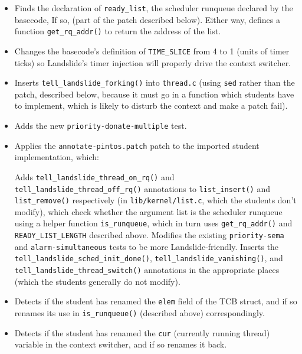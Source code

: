 \begin{itemize}
	\item Finds the declaration of {\tt ready\_list}, the scheduler runqueue declared by the basecode,
		If so,
		(part of the patch described below).
		Either way,
		defines a function {\tt get\_rq\_addr()} to return the address of the %
		list.
	\item Changes the basecode's definition of {\tt TIME\_SLICE} from 4 to 1 (units of timer ticks)
		so Landslide's timer injection will properly drive the context switcher.
	\item Inserts {\tt tell\_landslide\_forking()} into {\tt thread.c}
		(using {\tt sed} rather than the patch, described below,
		because it must go in a function which students have to implement,
		which is likely to disturb the context and make a patch fail).
	\item Adds the new {\tt priority-donate-multiple} test.
	\item Applies the {\tt annotate-pintos.patch} patch to the imported student implementation, which:
	\begin{itemize}
		\llitem Adds {\tt tell\_landslide\_thread\_on\_rq()}
			and {\tt tell\_landslide\_thread\_off\_rq()}
			annotations
			to {\tt list\_insert()} and {\tt list\_remove()} respectively
			(in {\tt lib/kernel/\allowbreak{}list.c}, which the students don't modify),
			which
			check whether the argument list
			is the scheduler runqueue
			using a helper function {\tt is\_runqueue},
			which in turn uses {\tt get\_rq\_addr()} and {\tt READY\_LIST\_LENGTH} described above.
		\llitem Modifies the existing {\tt priority-sema} and {\tt alarm-simultaneous} tests to be more Landslide-friendly.
		\llitem Inserts the {\tt tell\_landslide\_sched\_init\_done()},
			{\tt tell\_landslide\_vanishing()},
			and {\tt tell\_landslide\_thread\_switch()}
			annotations in the appropriate places
			(which the students generally do not modify).
	\end{itemize}
	\item Detects if the student has renamed the {\tt elem} field of the TCB struct,
		and if so renames its use in {\tt is\_runqueue()} (described above) correspondingly.
	\item Detects if the student has renamed the {\tt cur} (currently running thread) variable
		in the context switcher, and if so renames it back.
\end{itemize}

